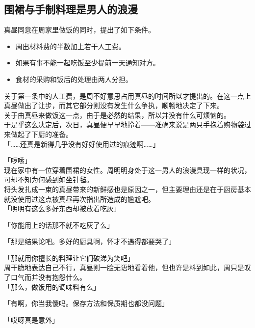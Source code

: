 \subsection{围裙与手制料理是男人的浪漫}

真昼同意在周家里做饭的同时，提出了如下条件。\\

\begin{itemize}
    \item 周出材料费的半数加上若干人工费。
    \item 如果有事不能一起吃饭至少提前一天通知对方。
    \item 食材的采购和饭后的处理由两人分担。
\end{itemize}

关于第一条中的人工费，是周不好意思占用真昼的时间所以才提出的。在这一点上真昼做出了让步，而其它部分则没有发生什么争执，顺畅地决定了下来。\\

关于由真昼来做饭这一点，由于是必然的结果，所以并没有什么可烦恼的。\\

于是乎这么决定后，次日，真昼便早早地拎着——准确来说是两只手抱着购物袋过来做起了下厨的准备。\\

「……还真是新得几乎没有好好使用过的痕迹啊……」

「啰嗦」\\

现在家中有一位穿着围裙的女性。周明明身处于这一男人的浪漫具现一样的状况，可却不知为何感到如坐针毡。\\

将头发扎成一束的真昼带来的新鲜感也是原因之一，但主要理由还是在于厨房基本就没使用过这点被真昼再次指出所造成的尴尬吧。\\

「明明有这么多好东西却被放着吃灰」

「你能用上的话那不就不吃灰了么」

「那是结果论吧。多好的厨具啊，怀才不遇得都要哭了」

「那就用你擅长的料理让它们破涕为笑吧」\\

周干脆地表达自己不行，真昼则一脸无语地看着他，但也许是料到如此，周只是叹了口气而并没有抱怨什么。\\

「那么，做饭用的调味料有么」

「有啊，你当我傻吗。保存方法和保质期也都没问题」

「哎呀真是意外」

